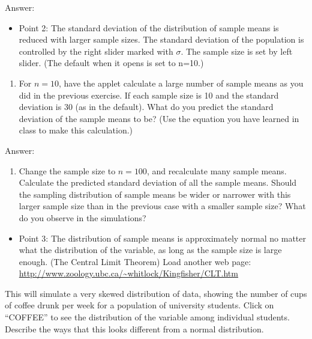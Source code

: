 \documentclass[
]{article}
\providecommand{\tightlist}{%
  \setlength{\itemsep}{0pt}\setlength{\parskip}{0pt}}
\begin{document}
Answer:

\begin{itemize}
\tightlist
\item
  Point 2: The standard deviation of the distribution of sample means is
  reduced with larger sample sizes. The standard deviation of the
  population is controlled by the right slider marked with \(\sigma\).
  The sample size is set by left slider. (The default when it opens is
  set to n=10.)
\end{itemize}

\begin{enumerate}
\def\labelenumi{\Alph{enumi})}
\setcounter{enumi}{1}
\tightlist
\item
  For \(n=10\), have the applet calculate a large number of sample means
  as you did in the previous exercise. If each sample size is 10 and the
  standard deviation is 30 (as in the default). What do you predict the
  standard deviation of the sample means to be? (Use the equation you
  have learned in class to make this calculation.)
\end{enumerate}

Answer:

\begin{enumerate}
\def\labelenumi{\Alph{enumi})}
\setcounter{enumi}{2}
\tightlist
\item
  Change the sample size to \(n=100\), and recalculate many sample
  means. Calculate the predicted standard deviation of all the sample
  means. Should the sampling distribution of sample means be wider or
  narrower with this larger sample size than in the previous case with a
  smaller sample size? What do you observe in the simulations?
\end{enumerate}

\begin{itemize}
\tightlist
\item
  Point 3: The distribution of sample means is approximately normal no
  matter what the distribution of the variable, as long as the sample
  size is large enough. (The Central Limit Theorem) Load another web
  page: \url{http://www.zoology.ubc.ca/~whitlock/Kingfisher/CLT.htm}
\end{itemize}

This will simulate a very skewed distribution of data, showing the
number of cups of coffee drunk per week for a population of university
students. Click on ``COFFEE'' to see the distribution of the variable
among individual students. Describe the ways that this looks different
from a normal distribution.
\end{document}
